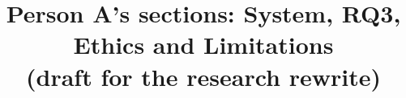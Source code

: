 \documentclass[conference]{IEEEtran}
\begin{document}
\title{Person A's sections: System, RQ3, Ethics and Limitations\\(draft for the research rewrite)}
\author{}
\maketitle








\end{document}

